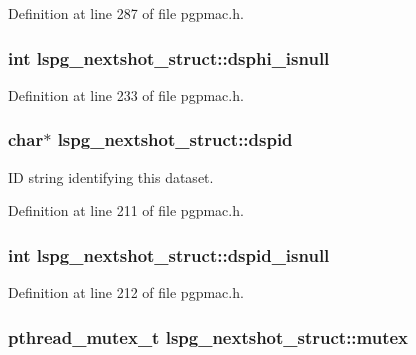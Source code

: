 Definition at line 287 of file pgpmac.\-h.

\hypertarget{structlspg__nextshot__struct_a2d1f51cb1bb575a214344773136be878}{
\subsubsection[{dsphi\-\_\-isnull}]{\setlength{\rightskip}{0pt plus 5cm}int lspg\-\_\-nextshot\-\_\-struct\-::dsphi\-\_\-isnull}}\label{structlspg__nextshot__struct_a2d1f51cb1bb575a214344773136be878}


Definition at line 233 of file pgpmac.\-h.

\hypertarget{structlspg__nextshot__struct_a4487e718c2b55a8ab9ebb18329574ae1}{
\subsubsection[{dspid}]{\setlength{\rightskip}{0pt plus 5cm}char$\ast$ lspg\-\_\-nextshot\-\_\-struct\-::dspid}}\label{structlspg__nextshot__struct_a4487e718c2b55a8ab9ebb18329574ae1}


I\-D string identifying this dataset. 



Definition at line 211 of file pgpmac.\-h.

\hypertarget{structlspg__nextshot__struct_a7665485395487756ab448d0c81c84d10}{
\subsubsection[{dspid\-\_\-isnull}]{\setlength{\rightskip}{0pt plus 5cm}int lspg\-\_\-nextshot\-\_\-struct\-::dspid\-\_\-isnull}}\label{structlspg__nextshot__struct_a7665485395487756ab448d0c81c84d10}


Definition at line 212 of file pgpmac.\-h.

\hypertarget{structlspg__nextshot__struct_a38b657155fbee9b73278f76912cf2333}{
\subsubsection[{mutex}]{\setlength{\rightskip}{0pt plus 5cm}pthread\-\_\-mutex\-\_\-t lspg\-\_\-nextshot\-\_\-struct\-::mutex}}\label{structlspg__nextshot__struct_a38b657155fbee9b73278f76912cf2333}


